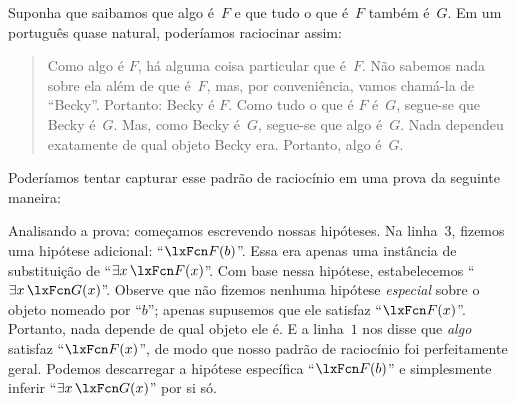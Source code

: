 Suponha que saibamos que algo é~$F$ e que tudo o que é~$F$ também é~$G$. Em um português quase natural, poderíamos raciocinar assim:
	\begin{quote}
Como algo é $F$, há alguma coisa particular que é~$F$. Não sabemos nada sobre ela além de que é~$F$, mas, por conveniência, vamos chamá-la de \textquotedblleft Becky\textquotedblright{}. Portanto: Becky é $F$. Como tudo o que é $F$ é~$G$, segue-se que Becky é~$G$. Mas, como Becky é~$G$, segue-se que algo é~$G$. Nada dependeu exatamente de qual objeto Becky era. Portanto, algo é~$G$.
	\end{quote}
Poderíamos tentar capturar esse padrão de raciocínio em uma prova da seguinte maneira:
\begin{fitchproof}
	\PR
	\PR
	\open
		\AS
		 
	\close
\end{fitchproof}\noindent
Analisando a prova: começamos escrevendo nossas hipóteses. Na linha~$3$, fizemos uma hipótese adicional: \textquotedblleft $\atom{F}{b}$\textquotedblright{}. Essa era apenas uma instância de substituição de \textquotedblleft $\exists x\,\atom{F}{x}$\textquotedblright{}. Com base nessa hipótese, estabelecemos \textquotedblleft $\exists x\,\atom{G}{x}$\textquotedblright{}. Observe que não fizemos nenhuma hipótese \emph{especial} sobre o objeto nomeado por \textquotedblleft $b$\textquotedblright{}; apenas supusemos que ele satisfaz \textquotedblleft $\atom{F}{x}$\textquotedblright{}. Portanto, nada depende de qual objeto ele é. E a linha~$1$ nos disse que \emph{algo} satisfaz \textquotedblleft $\atom{F}{x}$\textquotedblright{}, de modo que nosso padrão de raciocínio foi perfeitamente geral. Podemos descarregar a hipótese específica \textquotedblleft $\atom{F}{b}$\textquotedblright{} e simplesmente inferir \textquotedblleft $\exists x\,\atom{G}{x}$\textquotedblright{} por si só.

